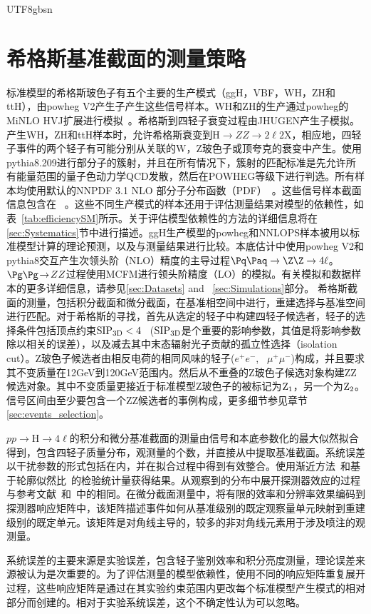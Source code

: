 \begin{CJK}{UTF8}{gbsn}
	\section{希格斯基准截面的测量策略}\label{strategy_chinese}
	标准模型的希格斯玻色子有五个主要的生产模式（ggH，VBF，WH，ZH和ttH），由{\sc powheg V2}产生子产生这些信号样本。WH和ZH的生产通过{\sc powheg}的{\sc MiNLO HVJ}扩展进行模拟~\cite{Luisoni:2013kna}。希格斯到四轻子衰变过程由{\sc JHUGEN}产生子模拟\cite{Gao:2010qx}。产生WH，ZH和ttH样本时，允许希格斯衰变到H$\to ZZ \to 2\ell2$X，相应地，四轻子事件的两个轻子有可能分别从关联的W，Z玻色子或顶夸克的衰变中产生。使用{\sc pythia8.209}进行部分子的簇射，并且在所有情况下，簇射的匹配标准是先允许所有能量范围的量子色动力学QCD发散，然后在POWHEG等级下进行判选。所有样本均使用默认的NNPDF 3.1 NLO 部分子分布函数（PDF）~\cite{Ball:2014uwa}。这些信号样本截面信息包含在 ~\cite{CMS:2019chr}。这些不同生产模式的样本还用于评估测量结果对模型的依赖性，如表~\ref{tab:efficiencySM}所示。关于评估模型依赖性的方法的详细信息将在\ref{sec:Systematics}节中进行描述。ggH生产模型的{\sc powheg}和{\sc NNLOPS}样本被用以标准模型计算的理论预测，以及与测量结果进行比较。本底估计中使用{\sc powheg V2}和{\sc pythia8}交互产生次领头阶（NLO）精度的主导过程$\Pq\Paq \to \Z \Z \to 4\ell$。$\Pg\Pg \! \to \! ZZ$过程使用{\sc MCFM}进行领头阶精度（LO）的模拟。有关模拟和数据样本的更多详细信息，请参见\ref{sec:Datasets} and ~\ref{sec:Simulations}部分。
希格斯截面的测量，包括积分截面和微分截面，在基准相空间中进行，重建选择与基准空间进行匹配。对于希格斯的寻找，首先从选定的轻子中构建四轻子候选者，轻子的选择条件包括顶点约束${\rm SIP_{3D}} < 4$~ (${\rm SIP_{3D}}$是个重要的影响参数，其值是将影响参数除以相关的误差），以及减去其中末态辐射光子贡献的孤立性选择（isolation cut）。Z玻色子候选者由相反电荷的相同风味的轻子($e^+ e^-$, \, $\mu^+\mu^-$)构成，并且要求其不变质量在12GeV到120GeV范围内。然后从不重叠的Z玻色子候选对象构建ZZ候选对象。其中不变质量更接近于标准模型Z玻色子的被标记为${\rm Z_1}$，另一个为${\rm Z_2}$。信号区间由至少要包含一个ZZ候选者的事例构成，更多细节参见章节\ref{sec:events_selection}。
\par $pp\to$H$\to4\ell$的积分和微分基准截面的测量由信号和本底参数化的最大似然拟合得到，包含四轻子质量分布，观测量的个数，并直接从中提取基准截面。系统误差以干扰参数的形式包括在内，并在拟合过程中得到有效整合。使用渐近方法~\cite{LHC-HCG}和基于轮廓似然比~\cite{Cowan:2010js}的检验统计量获得结果。从观察到的分布中展开探测器效应的过程与参考文献~\cite{CMSH4lFiducial8TeV}和~\cite{CMSHggFiducial8TeV}中的相同。在微分截面测量中，将有限的效率和分辨率效果编码到探测器响应矩阵中，该矩阵描述事件如何从基准级别的既定观察量单元映射到重建级别的既定单元。该矩阵是对角线主导的，较多的非对角线元素用于涉及喷注的观测量。
\par 系统误差的主要来源是实验误差，包含轻子鉴别效率和积分亮度测量，理论误差来源被认为是次重要的。为了评估测量的模型依赖性，使用不同的响应矩阵重复展开过程，这些响应矩阵是通过在其实验约束范围内更改每个标准模型产生模式的相对部分而创建的。相对于实验系统误差，这个不确定性认为可以忽略。


\end{CJK}
